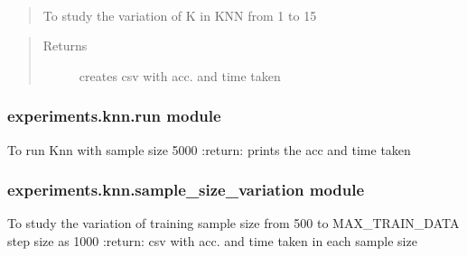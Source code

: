 \documentclass[letterpaper,10pt,english]{sphinxmanual}
\begin{document}
\begin{fulllineitems}
\label{\detokenize{experiments.knn:experiments.knn.k_variation.k_variation}}~\begin{quote}

To study the variation of K in KNN from 1 to 15
\end{quote}
\begin{quote}\begin{description}
\item[{Returns}] \leavevmode
creates csv with acc. and time taken

\end{description}\end{quote}

\end{fulllineitems}



\subsubsection{experiments.knn.run module}
\label{\detokenize{experiments.knn:module-experiments.knn.run}}\label{\detokenize{experiments.knn:experiments-knn-run-module}}

\begin{fulllineitems}
\label{\detokenize{experiments.knn:experiments.knn.run.run}}
To run Knn with sample size 5000
:return: prints the acc and time taken

\end{fulllineitems}



\subsubsection{experiments.knn.sample\_size\_variation module}
\label{\detokenize{experiments.knn:module-experiments.knn.sample_size_variation}}\label{\detokenize{experiments.knn:experiments-knn-sample-size-variation-module}}

\begin{fulllineitems}
\label{\detokenize{experiments.knn:experiments.knn.sample_size_variation.variate_sample_size}}
To study the variation of training sample size from 500 to MAX\_TRAIN\_DATA step size as 1000
:return: csv with acc. and time taken in each sample size

\end{fulllineitems}
\end{document}
